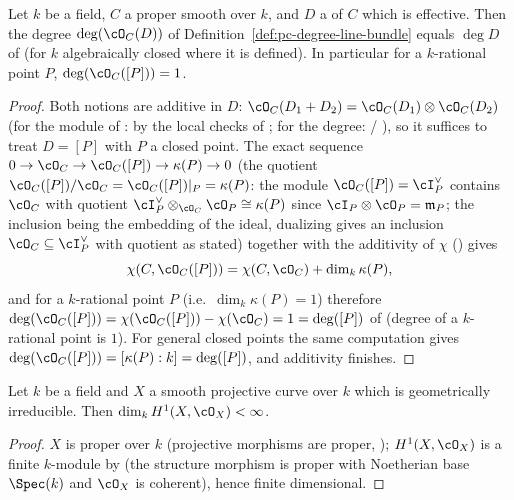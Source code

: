 \begin{lemma}
\label{lem:pc-degree-agrees-sc}
Let $k$ be a field, $C$ a proper smooth
 over $k$, and $D$ a
 of $C$ which is effective.  Then the
degree $\deg(\cO_C(D))$ of
Definition~\ref{def:pc-degree-line-bundle}
equals $\deg D$ of  (for $k$ algebraically closed
where it is defined).  In particular for a $k$-rational point $P$,
$\deg(\cO_C([P]))=1$.
\end{lemma}
\begin{proof}
Both notions are additive in $D$: $\cO_C(D_1+D_2)=\cO_C(D_1)\otimes\cO_C(D_2)$
(for the module of
: by the local checks of
; for the degree:
 / ), so it
suffices to treat $D=[P]$ with $P$ a closed point.  The exact sequence
$0\to\cO_C\to\cO_C([P])\to\kappa(P)\to0$ (the quotient
$\cO_C([P])/\cO_C=\cO_C([P])|_P=\kappa(P)$: the module
$\cO_C([P])=\cI_P^\vee$ contains $\cO_C$ with quotient
$\cI_P^\vee\otimes_{\cO_C}\cO_P\cong\kappa(P)$ since
$\cI_P\otimes\cO_P=\mathfrak m_P$; the inclusion being the embedding of
the ideal, dualizing gives an inclusion $\cO_C\subseteq\cI_P^\vee$ with
quotient as stated) together with the additivity of $\chi$
() gives
\[
\chi(C,\cO_C([P]))=\chi(C,\cO_C)+\dim_k\kappa(P),
\]
and for a $k$-rational point $P$ (i.e.\ $\dim_k\kappa(P)=1$) therefore
$\deg(\cO_C([P]))=\chi(\cO_C([P]))-\chi(\cO_C)=1=\deg([P])$ of
 (degree of a $k$-rational point is $1$).  For
general closed points the same computation gives
$\deg(\cO_C([P]))=[\kappa(P):k]=\deg([P])$, and additivity finishes.
\end{proof}

\begin{lemma}\label{lem:pc-genus-well-defined}
Let $k$ be a field and $X$ a smooth projective curve over $k$ which is
geometrically irreducible.  Then
$\dim_kH^1(X,\cO_X)<\infty$.
\end{lemma}
\begin{proof}
$X$ is proper over $k$ (projective morphisms are proper,
); $H^1(X,\cO_X)$ is a finite
$k$-module by  (the structure morphism is
proper with Noetherian base $\Spec(k)$ and $\cO_X$ is coherent), hence
finite dimensional.
\end{proof}

